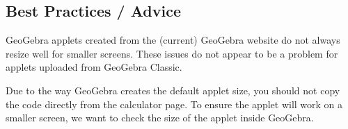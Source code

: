\documentclass{ximera}
\begin{document}
    \subsection*{Best Practices / Advice}

        GeoGebra applets created from the (current) GeoGebra website do not always resize well for smaller screens. These issues do not appear to be a problem for applets uploaded from GeoGebra Classic.


        Due to the way GeoGebra creates the default applet size, you should not copy the code directly from the calculator page. To ensure the applet will work on a smaller screen, we want to check the size of the applet inside GeoGebra. 
        
\end{document}
